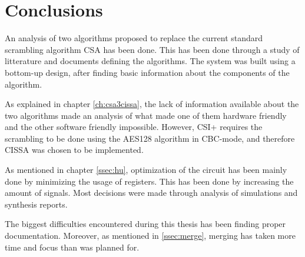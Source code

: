 \section{Conclusions}
An analysis of two algorithms proposed to replace the current standard 
scrambling algorithm CSA has been done. This has been done through 
a study of litterature and documents defining the algorithms. The 
system was built using a bottom-up design, after finding basic 
information about the components of the algorithm.

As explained in chapter \ref{ch:csa3cissa}, the lack of information 
available about the two algorithms made an analysis of what made one 
of them hardware friendly and the other software friendly impossible. 
However, CSI+ requires the scrambling to be done using the AES128 
algorithm in CBC-mode, and therefore CISSA was chosen to be 
implemented.

As mentioned in chapter \ref{ssec:hu}, optimization of the circuit has 
been mainly done by minimizing the usage of registers. This has been 
done by increasing the amount of signals. Most decisions were made 
through analysis of simulations and synthesis reports.

The biggest difficulties encountered during this thesis has been 
finding proper documentation. Moreover, as mentioned in 
\ref{ssec:merge}, merging has taken more time and focus than was 
planned for.
